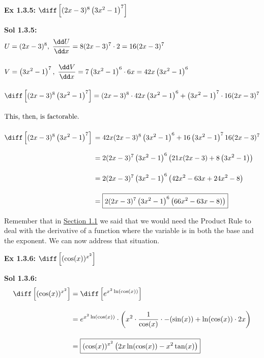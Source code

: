\begin{tcolorbox}[example]
    \textbf{Ex 1.3.5: } $\diff \left[(2x - 3)^8\left(3x^2 - 1\right)^7\right]$ 
\end{tcolorbox}
\begin{tcolorbox}[solution]
    \textbf{Sol 1.3.5: } \begin{align*}
        & U = (2x - 3)^8, \; \dfrac{\dd U}{\dd x} = 8(2x - 3)^7 \cdot 2 = 16(2x - 3)^7 \\[11pt]
        & V = \left(3x^2 - 1\right)^7, \; \dfrac{\dd V}{\dd x} = 7\left(3x^2 - 1\right)^6 \cdot 6x  = 42x\left(3x^2 - 1\right)^6\\[11pt]
        & \diff \left[(2x - 3)^8\left(3x^2 - 1\right)^7\right] = (2x - 3)^8 \cdot 42x\left(3x^2 - 1\right)^6 + \left(3x^2 - 1\right)^7 \cdot 16(2x - 3)^7 \\[11pt]
        & \text{This, then, is factorable.} \\[11pt]
        & \diff \left[(2x - 3)^8\left(3x^2 - 1\right)^7\right] \begin{aligned}[t]
            & = 42x(2x - 3)^8\left(3x^2 - 1\right)^6 + 16\left(3x^2 - 1\right)^7 16(2x - 3)^7 \\[11pt]
            & = 2(2x - 3)^7\left(3x^2 - 1\right)^6\left(21x(2x - 3) + 8\left(3x^2 - 1\right)\right) \\[11pt]
            & = 2(2x - 3)^7\left(3x^2 - 1\right)^6\left(42x^2 - 63x + 24x^2 - 8\right) \\[11pt]
            & = \boxed{2(2x - 3)^7\left(3x^2 - 1\right)^6\left(66x^2 - 63x - 8)\right)}
        \end{aligned}
    \end{align*}
\end{tcolorbox}

Remember that in \hyperlink{Section 1.1}{Section 1.1} we said that we would need the Product Rule to deal with the derivative of a function where the variable is in both the base and the exponent. We can now address that situation. \par

\begin{tcolorbox}[example]
    \textbf{Ex 1.3.6: } $\diff \left[(\cos (x))^{x^2}\right]$
\end{tcolorbox}
\begin{tcolorbox}[solution]
    \textbf{Sol 1.3.6: } \begin{align*}
        \diff \left[(\cos (x))^{x^2}\right] & = \diff \left[e^{x^2\ln (\cos (x))}\right] \\[11pt]
        & = e^{x^2\ln (\cos (x))} \cdot \left(x^2 \cdot \dfrac{1}{\cos (x)} \cdot -(\sin (x)) + \ln (\cos (x)) \cdot 2x\right) \\[11pt]
        & = \boxed{(\cos (x))^{x^2}\left(2x\ln (\cos (x)) - x^2\tan (x)\right)}
    \end{align*} 
\end{tcolorbox}

